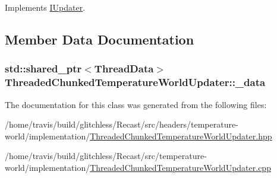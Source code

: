 Implements \hyperlink{class_i_updater_a08a8af34922a2320f5ab5617e6e31276}{I\-Updater}.



\subsection{Member Data Documentation}
\hypertarget{class_threaded_chunked_temperature_world_updater_ac1ccf89503ccb9f4aea1437188246503}{
\subsubsection[{\-\_\-data}]{\setlength{\rightskip}{0pt plus 5cm}std\-::shared\-\_\-ptr$<${\bf Thread\-Data}$>$ Threaded\-Chunked\-Temperature\-World\-Updater\-::\-\_\-data\hspace{0.3cm}{\ttfamily [protected]}}}\label{class_threaded_chunked_temperature_world_updater_ac1ccf89503ccb9f4aea1437188246503}


The documentation for this class was generated from the following files\-:\begin{DoxyCompactItemize}
\item 
/home/travis/build/glitchless/\-Recast/src/headers/temperature-\/world/implementation/\hyperlink{_threaded_chunked_temperature_world_updater_8hpp}{Threaded\-Chunked\-Temperature\-World\-Updater.\-hpp}\item 
/home/travis/build/glitchless/\-Recast/src/temperature-\/world/implementation/\hyperlink{_threaded_chunked_temperature_world_updater_8cpp}{Threaded\-Chunked\-Temperature\-World\-Updater.\-cpp}\end{DoxyCompactItemize}
